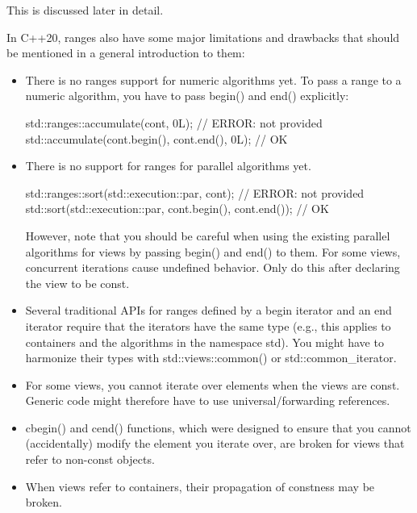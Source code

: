 This is discussed later in detail.


In C++20, ranges also have some major limitations and drawbacks that should be mentioned in a general introduction to them:

\begin{itemize}
\item
There is no ranges support for numeric algorithms yet. To pass a range to a numeric algorithm, you have to pass begin() and end() explicitly:

\begin{cpp}
std::ranges::accumulate(cont, 0L); // ERROR: not provided
std::accumulate(cont.begin(), cont.end(), 0L); // OK
\end{cpp}

\item
There is no support for ranges for parallel algorithms yet.

\begin{cpp}
std::ranges::sort(std::execution::par, cont); // ERROR: not provided
std::sort(std::execution::par, cont.begin(), cont.end()); // OK
\end{cpp}

However, note that you should be careful when using the existing parallel algorithms for views by passing begin() and end() to them. For some views, concurrent iterations cause undefined behavior. Only do this after declaring the view to be const.

\item
Several traditional APIs for ranges defined by a begin iterator and an end iterator require that the iterators have the same type (e.g., this applies to containers and the algorithms in the namespace std). You might have to harmonize their types with std::views::common() or std::common\_iterator.

\item
For some views, you cannot iterate over elements when the views are const. Generic code might therefore have to use universal/forwarding references.

\item
cbegin() and cend() functions, which were designed to ensure that you cannot (accidentally) modify the element you iterate over, are broken for views that refer to non-const objects.

\item
When views refer to containers, their propagation of constness may be broken.


\end{itemize}
